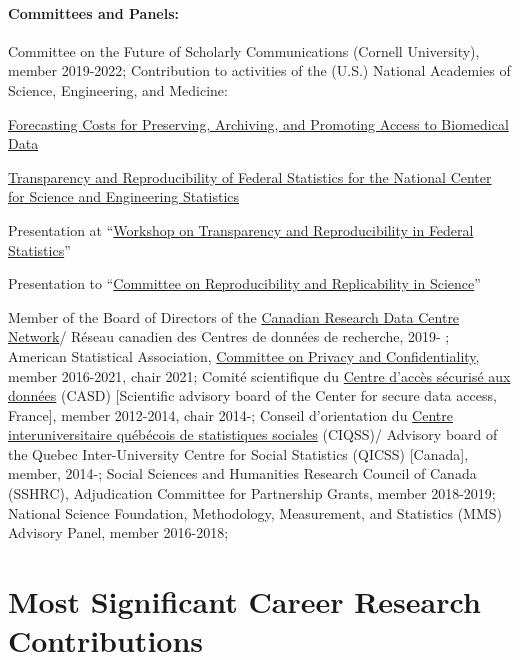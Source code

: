 \documentclass[12pt,letterpaper]{article}
\begin{document}
\paragraph{Committees and Panels:\ } 
Committee on the Future of Scholarly Communications (Cornell University), member 2019-2022; 
Contribution to activities of the (U.S.) National Academies of Science, Engineering, and Medicine:
\begin{itemize*}
	\item \href{https://www8.nationalacademies.org/pa/projectview.aspx?key=51436}{Forecasting Costs for Preserving, Archiving, and Promoting Access to Biomedical Data} 
	\item \href{https://www8.nationalacademies.org/pa/projectview.aspx?key=51187}{Transparency and Reproducibility of Federal Statistics for the National Center for Science and Engineering Statistics} 
	\item  Presentation at ``\href{https://www8.nationalacademies.org/pa/projectview.aspx?key=49809}{Workshop on Transparency and Reproducibility in Federal Statistics}''
	\item Presentation to ``\href{https://www8.nationalacademies.org/pa/projectview.aspx?key=49906}{Committee on Reproducibility and Replicability in Science}''
\end{itemize*} 
%
Member of the Board of Directors of the \href{https://crdcn.org/}{Canadian Research Data Centre Network}/ R\'eseau canadien des Centres de donn\'ees de recherche, 2019- ;
American Statistical Association, \href{http://community.amstat.org/cpc/home}{Committee on Privacy and Confidentiality}, member 2016-2021, chair 2021; 
Comit\'e scientifique du \href{https://casd.eu/}{Centre d'acc\`es s\'ecuris\'e aux 
donn\'ees} (CASD) [Scientific advisory board of the Center for secure data 
access, France], member 2012-2014, chair 2014-;
Conseil d'orientation du \href{https://ciqss.org}{Centre interuniversitaire 	qu\'eb\'ecois de statistiques sociales} (CIQSS)/ Advisory board of the Quebec Inter-University 
Centre for Social Statistics (QICSS) [Canada], member, 2014-;
Social Sciences and Humanities Research Council of Canada (SSHRC), Adjudication Committee for Partnership Grants, member 2018-2019;
National Science Foundation, Methodology, Measurement, and Statistics (MMS) Advisory Panel, member 2016-2018;

\section{Most Significant Career Research Contributions}
\end{document}
